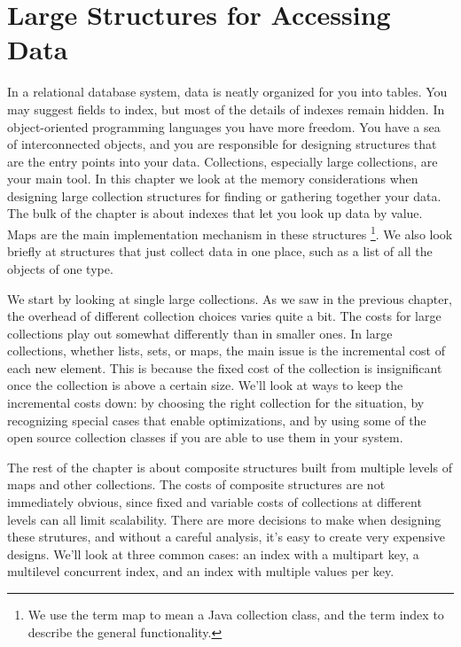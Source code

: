\chapter{Large Structures for Accessing Data}
\label{chapter:tables-indexes}

In a relational database system, data is neatly organized for you into tables.
You may suggest fields to index, but most of the details of indexes remain
hidden. In object-oriented programming languages you have more freedom. You have a sea of
interconnected objects, and you are responsible for designing structures that are the entry points into your
data. Collections, especially large collections, are your
main tool. In this chapter we look at the memory considerations when
designing large collection structures for finding or gathering together your
data. The bulk of the chapter is about indexes that let
you look up data by value. Maps are the main implementation mechanism in these
structures \footnote{We use the term map to mean a Java collection class,
and the term index to describe the general functionality.}. We also look briefly
at structures that just collect data in one place, such as a list
of all the objects of one type.

We start by looking at single large collections.
As we saw in the previous chapter, the
overhead of different collection choices varies quite a bit. The costs for large
collections play out somewhat differently than in smaller ones. In
large collections, whether lists, sets, or maps, the main issue is the
incremental cost of each new element. This is because the fixed cost of the
collection is insignificant once the collection is above a certain size.  We'll
look at ways to keep the incremental costs down: by choosing the right collection for the situation,
by recognizing special cases that enable optimizations, and by using some of the open source
collection classes if you are able to use them in your system.

The rest of the chapter is about composite structures built from multiple levels of maps and other collections. 
The costs of composite structures are not immediately obvious, since fixed and
variable costs of collections at different levels can all limit scalability. There are 
more decisions to make when designing these strutures, and 
without a careful analysis, it's easy to create very expensive
designs. We'll look at three common cases: an index
with a multipart key, a multilevel concurrent index, and an index with multiple values per key.  

